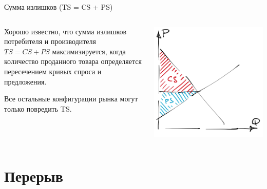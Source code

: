 \documentclass{beamer}
\begin{document}
\begin{frame}{Сумма излишков (TS = CS + PS)}
\begin{columns}
\begin{column}{0.45\textwidth}
   Хорошо известно, что сумма излишков потребителя и производителя $TS = CS+PS$ максимизируется, когда количество проданного товара определяется пересечением кривых спроса и предложения.   
   
  \medskip
  
  Все остальные конфигурации рынка могут только повредить TS.
   
   \end{column}
\begin{column}{0.55\textwidth}  %
    \begin{center}
     \includegraphics[width=1\textwidth]{CSPS}
     \end{center}
\end{column}
\end{columns}
\end{frame}

\section{Перерыв}
\end{document}

